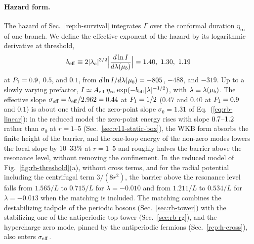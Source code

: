 \paragraph{Hazard form.}
The hazard of Sec.~\ref{rep:h-survival} integrates $\Gamma$ over the conformal duration $\eta_\infty$ of one branch.
We define the effective exponent of the hazard by its logarithmic derivative at threshold,
\begin{equation}
b_{\rm eff}\equiv2|\lamc|^{3/2}\Bigl|\frac{d\ln I}{d\lambda(\mub)}\Bigr|=1.40,\ 1.30,\ 1.19 %
\label{eq:rb-beff}
\end{equation}
at $P_1=0.9$, $0.5$, and $0.1$, from $d\ln I/d\lambda(\mu_b)=-805$, $-488$, and $-319$. %
Up to a slowly varying prefactor, $I\simeq A_{\rm eff}\,\eta_\infty\exp(-b_{\rm eff}|\lambda|^{-1/2})$, with $\lambda\equiv\lambda(\mu_b)$.
The effective slope $\sigma_{\rm eff}=b_{\rm eff}/2.962=0.44$ at $P_1=1/2$ ($0.47$ and $0.40$ at $P_1=0.9$ and $0.1$) is about one third of the zero-point slope $\sigma_0=1.31$ of Eq.~(\ref{eq:rb-linear}): in the reduced model the zero-point energy rises with slope $0.7$--$1.2$ rather than $\sigma_0$ at $r=1$--5 (Sec.~\ref{sec:v11-static-box}), the WKB form absorbs the finite height of the barrier, and the one-loop energy of the non-zero modes lowers the local slope by $10$--$33\%$ at $r=1$--5 and roughly halves the barrier above the resonance level, without removing the confinement. %
In the reduced model of Fig.~\ref{fig:rb-threshold}(a), without cross terms, and for the radial potential including the centrifugal term $3/(8r^2)$, the barrier above the resonance level falls from $1.565/L$ to $0.715/L$ for $\lambda=-0.010$ and from $1.211/L$ to $0.534/L$ for $\lambda=-0.013$ when the matching is included. %
The matching combines the destabilizing tadpole of the periodic bosons (Sec.~\ref{sec:rb-tower}) with the stabilizing one of the antiperiodic top tower (Sec.~\ref{sec:rb-rg}), and the hypercharge zero mode, pinned by the antiperiodic fermions (Sec.~\ref{rep:h-cross}), also enters $\sigma_{\rm eff}$. %


